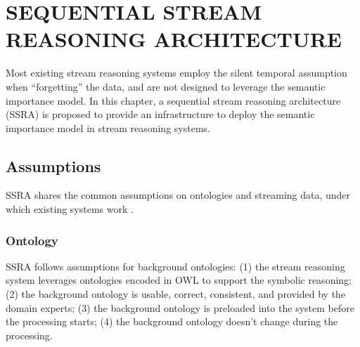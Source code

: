  
\chapter{SEQUENTIAL STREAM REASONING ARCHITECTURE}
Most existing stream reasoning systems employ the silent temporal assumption when ``forgetting'' the data, and are not designed to leverage the semantic importance model.
In this chapter, a sequential stream reasoning architecture (SSRA) is proposed to provide an infrastructure to deploy the semantic importance model in stream reasoning systems.

\section{Assumptions}
SSRA shares the common assumptions on ontologies and streaming data, under which existing systems work \cite{barbieri2009c} \cite{barbieri2010c} \cite{barbieri2010execution} \cite{barbieri2010incremental} \cite{anicic2011ep}.
%
\subsection{Ontology}
SSRA follows assumptions for background ontologies:
(1) the stream reasoning system leverages ontologies encoded in OWL \cite{mcguinness2004owl} to support the symbolic reasoning; 
(2) the background ontology is usable, correct, consistent, and provided by the domain experts;
(3) the background ontology is preloaded into the system before the processing starts;
(4) the background ontology doesn't change during the processing. 


